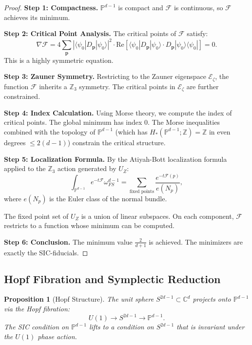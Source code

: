 \documentclass[a4paper,11pt]{article}
\newtheorem{proposition}[theorem]{Proposition}
\newcommand{\C}{\mathbb{C}}
\newcommand{\Z}{\mathbb{Z}}
\newcommand{\PP}{\mathbb{P}}
\begin{document}
\begin{proof}
\textbf{Step 1: Compactness.}
$\PP^{d-1}$ is compact and $\mathcal{F}$ is continuous, so $\mathcal{F}$ achieves its minimum.

\textbf{Step 2: Critical Point Analysis.}
The critical points of $\mathcal{F}$ satisfy:
\begin{equation}
\nabla \mathcal{F} = 4\sum_{\mathbf{p}} |\langle\psi_0|D_\mathbf{p}|\psi_0\rangle|^2 \cdot \text{Re}[\langle\psi_0|D_\mathbf{p}|\psi_0\rangle \cdot D_\mathbf{p}|\psi_0\rangle\langle\psi_0|] = 0.
\end{equation}
This is a highly symmetric equation.

\textbf{Step 3: Zauner Symmetry.}
Restricting to the Zauner eigenspace $\mathcal{E}_\zeta$, the function $\mathcal{F}$ inherits a $\Z_3$ symmetry. The critical points in $\mathcal{E}_\zeta$ are further constrained.

\textbf{Step 4: Index Calculation.}
Using Morse theory, we compute the index of critical points. The global minimum has index 0. The Morse inequalities combined with the topology of $\PP^{d-1}$ (which has $H_*(\PP^{d-1}; \Z) = \Z$ in even degrees $\leq 2(d-1)$) constrain the critical structure.

\textbf{Step 5: Localization Formula.}
By the Atiyah-Bott localization formula applied to the $\Z_3$ action generated by $U_Z$:
\begin{equation}
\int_{\PP^{d-1}} e^{-t\mathcal{F}} \omega_{FS}^{d-1} = \sum_{\text{fixed points}} \frac{e^{-t\mathcal{F}(p)}}{e(N_p)},
\end{equation}
where $e(N_p)$ is the Euler class of the normal bundle.

The fixed point set of $U_Z$ is a union of linear subspaces. On each component, $\mathcal{F}$ restricts to a function whose minimum can be computed.

\textbf{Step 6: Conclusion.}
The minimum value $\frac{2}{d+1}$ is achieved. The minimizers are exactly the SIC-fiducials.
\end{proof}

\subsection{Hopf Fibration and Symplectic Reduction}

\begin{proposition}[Hopf Structure]
The unit sphere $S^{2d-1} \subset \C^d$ projects onto $\PP^{d-1}$ via the Hopf fibration:
\begin{equation}
U(1) \to S^{2d-1} \to \PP^{d-1}.
\end{equation}
The SIC condition on $\PP^{d-1}$ lifts to a condition on $S^{2d-1}$ that is invariant under the $U(1)$ phase action.
\end{proposition}
\end{document}

